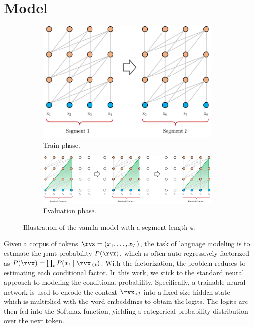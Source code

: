 \section{Model} \label{sec:model}
\begin{figure}[t]
	\begin{subfigure}[b]{0.292\linewidth}
		\includegraphics[width=\textwidth]{FIG/vanilla-train.pdf}
		\caption{\small Train phase.}
		\label{fig:vanilla-train}
	\end{subfigure}
	\begin{subfigure}[b]{0.69\linewidth}
		\includegraphics[width=\textwidth]{FIG/vanilla-eval.pdf}
		\caption{\small Evaluation phase.}
		\label{fig:vanilla-eval}
	\end{subfigure}
	\caption{\small Illustration of the vanilla model with a segment length 4.}
	\label{fig:vanilla}
\vspace{-1em}
\end{figure}

Given a corpus of tokens $\rvx = (x_1 , \dots, x_T)$, the task of language modeling is to estimate the joint probability $P(\rvx)$, which is often auto-regressively factorized as $P(\rvx) = \prod_{t} P(x_t \mid \rvx_{<t})$.
With the factorization, the problem reduces to estimating each conditional factor.
In this work, we stick to the standard neural approach to modeling the conditional probability.
Specifically, a trainable neural network is used to encode the context $\rvx_{<t}$ into a fixed size hidden state, which is multiplied with the word embeddings to obtain the logits.
The logits are then fed into the Softmax function, yielding a categorical probability distribution over the next token.

